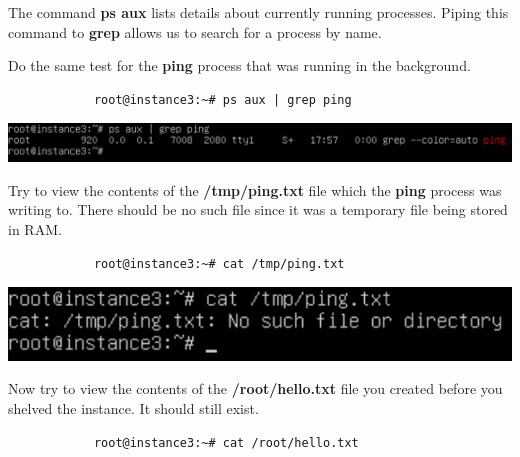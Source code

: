 \documentclass[letterpaper, 12pt]{article}
\begin{document}
\begin{enumerate}
    \begin{notebox}
        The command \textbf{ps aux} lists details about currently running processes.
        Piping this command to \textbf{grep} allows us to search for a process by name.
    \end{notebox}

    \begin{labstep}
        Do the same test for the \textbf{ping} process that was running in the background.
        \begin{lstlisting}
            root@instance3:~# ps aux | grep ping
        \end{lstlisting}

        \begin{center}
            \includegraphics[width=\linewidth]{images/part5/step17.png}
        \end{center}
    \end{labstep}

    \begin{labstep}
        Try to view the contents of the \textbf{/tmp/ping.txt} file which the \textbf{ping} process was writing to.
        There should be no such file since it was a temporary file being stored in RAM.
        \begin{lstlisting}
            root@instance3:~# cat /tmp/ping.txt
        \end{lstlisting}

        \begin{center}
            \includegraphics[width=\linewidth]{images/part5/step18.png}
        \end{center}
    \end{labstep}

    \begin{labstep}
        Now try to view the contents of the \textbf{/root/hello.txt} file you created before you shelved the instance.
        It should still exist.
        \begin{lstlisting}
            root@instance3:~# cat /root/hello.txt
        \end{lstlisting}


\end{labstep}
\end{enumerate}
\end{document}
